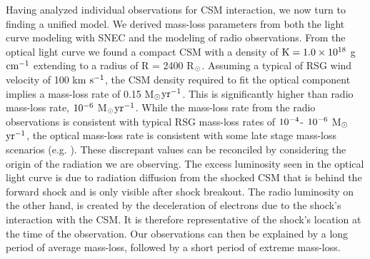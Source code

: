 \documentclass[a4paper,fleqn,usenatbib]{mnras}
\newcommand{\msunperiod}{M$\rm{_{\odot}}$}
\newcommand{\rsun}{R$\rm{_{\odot}}$}
\begin{document}
Having analyzed individual observations for CSM interaction, we now turn to finding a unified model.
We derived mass-loss parameters from both the light curve modeling with SNEC and the modeling of radio observations.
From the optical light curve we found a compact CSM with a density of $\rm{K = 1.0\times10^{18}}$ g $\rm{cm^{-1}}$ extending to a radius of R = 2400 \rsun. 
Assuming a typical of RSG wind velocity of 100 km $\rm{s^{-1}}$, the CSM density required to fit the optical component implies a mass-loss rate of 0.15 \msunperiod $\rm{yr^{-1}}$.
This is significantly higher than radio mass-loss rate, $\rm{10^{-6}}$ \msunperiod $\rm{yr^{-1}}$.
While the mass-loss rate from the radio observations is consistent with typical RSG mass-loss rates of $\rm{10^{-4} }$- $\rm{10^{-6}}$ \msunperiod $\rm{yr^{-1}}$, the optical mass-loss rate is consistent with some late stage mass-loss scenarios (e.g. \citealt{2012quatert,2014shiode,2017fuller, 2017yaron}).
These discrepant values can be reconciled by considering the origin of the radiation we are observing.
The excess luminosity seen in the optical light curve is due to radiation diffusion from the shocked CSM that is behind the forward shock and is only visible after shock breakout.
The radio luminosity on the other hand, is created by the deceleration of electrons due to the shock's interaction with the CSM.
It is therefore representative of the shock's location at the time of the observation.
Our observations can then be explained by a long period of average mass-loss, followed by a short period of extreme mass-loss.
\end{document}
